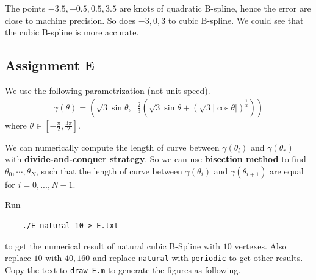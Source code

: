 \documentclass[11pt,en]{elegantpaper}
\begin{document}
The points $-3.5, -0.5, 0.5, 3.5$ are knots of quadratic B-spline, hence the error are close to machine precision. So does $-3,0,3$ to cubic B-spline. We could see that the cubic B-spline is more accurate.

\subsection{Assignment E}

We use the following parametrization (not unit-speed).
\begin{align*}
    \gamma(\theta) = \left(\sqrt{3} \sin\theta,\;\; \frac{2}{3}\left(\sqrt{3}\sin\theta + \left(\sqrt{3}|\cos \theta|\right)^\frac{1}{2}\right) \right)
\end{align*}
where $\theta\in[-\frac{\pi}{2},\frac{3\pi}{2}]$. 

We can numerically compute the length of curve between $\gamma(\theta_l)$ and $\gamma(\theta_r)$ with \textbf{divide-and-conquer strategy}. So we can use \textbf{bisection method} to find $\theta_0,\cdots,\theta_N$, such that the length of curve between $\gamma(\theta_i)$ and $\gamma(\theta_{i+1})$ are equal for $i=0,...,N-1$.

Run
\begin{lstlisting}
    ./E natural 10 > E.txt
\end{lstlisting}
to get the numerical result of natural cubic B-Spline with $10$ vertexes. Also replace $10$ with $40, 160$ and replace \verb|natural| with \verb|periodic| to get other results. Copy the text to \verb|draw_E.m| to generate the figures as following.
\end{document}

